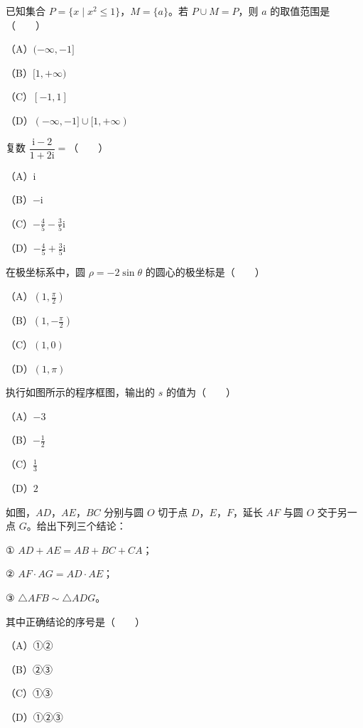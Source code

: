 \begin{question}
已知集合 $P=\{x\mid x^2\leqslant 1\}$，$M=\{a\}$。若 $P\cup M=P$，则 $a$ 的取值范围是\mbox{（　　）}

（A）$(-\infty,-1]$

（B）$[1,+\infty)$

（C）$[-1,1]$

（D）$(-\infty,-1]\cup[1,+\infty)$

\end{question}
\begin{question}
复数 $\dfrac{\mathrm{i}-2}{1+2\mathrm{i}}=$\mbox{（　　）}

（A）$\mathrm{i}$

（B）$-\mathrm{i}$

（C）$-\frac45-\frac35\mathrm{i}$

（D）$-\frac45+\frac35\mathrm{i}$

\end{question}
\begin{question}
在极坐标系中，圆 $\rho=-2\sin\theta$ 的圆心的极坐标是\mbox{（　　）}

（A）$\left(1,\frac{\pi}{2}\right)$

（B）$\left(1,-\frac{\pi}{2}\right)$

（C）$(1,0)$

（D）$(1,\pi)$

\Needspace{0.4\textheight}
\end{question}
\begin{question}
执行如图所示的程序框图，输出的 $s$ 的值为\mbox{（　　）}

（A）$-3$

（B）$-\frac12$

（C）$\frac13$

（D）$2$
\nopagebreak[4]
\begin{center}\end{center}
\nopagebreak[4]
\Needspace{0.4\textheight}
\end{question}
\begin{question}
如图，$AD$，$AE$，$BC$ 分别与圆 $O$ 切于点 $D$，$E$，$F$，延长 $AF$ 与圆 $O$ 交于另一点 $G$。给出下列三个结论：

① $AD+AE=AB+BC+CA$；

② $AF\cdot AG=AD\cdot AE$；

③ $\triangle AFB\sim\triangle ADG$。

其中正确结论的序号是\mbox{（　　）}

（A）①②

（B）②③

（C）①③

（D）①②③
\nopagebreak[4]
\begin{center}\end{center}
\nopagebreak[4]
\end{question}
